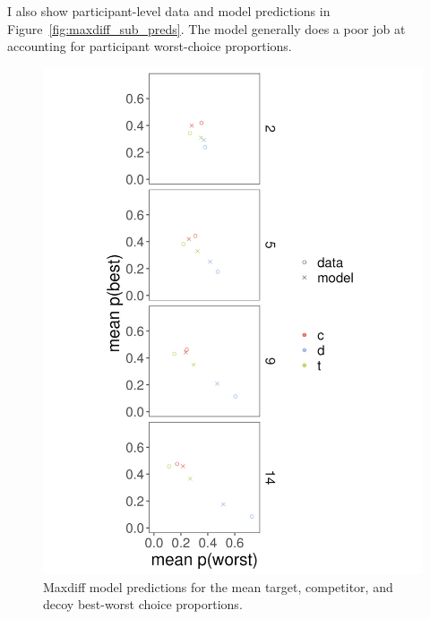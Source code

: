 I also show participant-level data and model predictions in Figure~\ref{fig:maxdiff_sub_preds}. The model generally does a poor job at accounting for participant worst-choice proportions.
\begin{figure}
   \includegraphics[width=\linewidth]{figures/maxdiff_1_means_model_v_data.jpeg}
   \caption{Maxdiff model predictions for the mean target, competitor, and decoy best-worst choice proportions.}
   \label{fig:maxdiff_collapsed_preds}
\end{figure}


